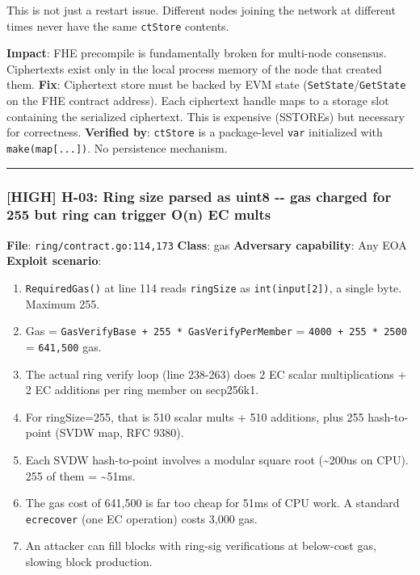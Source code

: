 \documentclass[
]{article}
\providecommand{\tightlist}{%
  \setlength{\itemsep}{0pt}\setlength{\parskip}{0pt}}
\begin{document}
This is not just a restart issue. Different nodes joining the network at
different times never have the same \texttt{ctStore} contents.

\textbf{Impact}: FHE precompile is fundamentally broken for multi-node
consensus. Ciphertexts exist only in the local process memory of the
node that created them. \textbf{Fix}: Ciphertext store must be backed by
EVM state (\texttt{SetState}/\texttt{GetState} on the FHE contract
address). Each ciphertext handle maps to a storage slot containing the
serialized ciphertext. This is expensive (SSTOREs) but necessary for
correctness. \textbf{Verified by}: \texttt{ctStore} is a package-level
\texttt{var} initialized with \texttt{make(map{[}...{]})}. No
persistence mechanism.

\begin{center}\rule{0.5\linewidth}{0.5pt}\end{center}

\subsubsection{{[}HIGH{]} H-03: Ring size parsed as uint8 -\/- gas
charged for 255 but ring can trigger O(n) EC
mults}\label{high-h-03-ring-size-parsed-as-uint8----gas-charged-for-255-but-ring-can-trigger-on-ec-mults}

\textbf{File}: \texttt{ring/contract.go:114,173} \textbf{Class}: gas
\textbf{Adversary capability}: Any EOA \textbf{Exploit scenario}:

\begin{enumerate}
\def\labelenumi{\arabic{enumi}.}
\tightlist
\item
  \texttt{RequiredGas()} at line 114 reads \texttt{ringSize} as
  \texttt{int(input{[}2{]})}, a single byte. Maximum 255.
\item
  Gas = \texttt{GasVerifyBase\ +\ 255\ *\ GasVerifyPerMember} =
  \texttt{4000\ +\ 255\ *\ 2500} = \texttt{641,500} gas.
\item
  The actual ring verify loop (line 238-263) does 2 EC scalar
  multiplications + 2 EC additions per ring member on secp256k1.
\item
  For ringSize=255, that is 510 scalar mults + 510 additions, plus 255
  hash-to-point (SVDW map, RFC 9380).
\item
  Each SVDW hash-to-point involves a modular square root
  (\textasciitilde200us on CPU). 255 of them = \textasciitilde51ms.
\item
  The gas cost of 641,500 is far too cheap for 51ms of CPU work. A
  standard \texttt{ecrecover} (one EC operation) costs 3,000 gas.
\item
  An attacker can fill blocks with ring-sig verifications at below-cost
  gas, slowing block production.
\end{enumerate}
\end{document}
